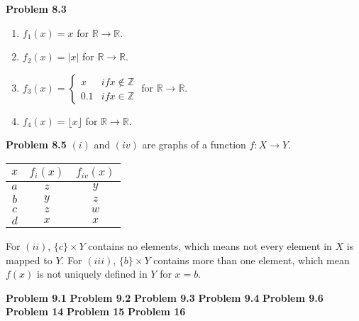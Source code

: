 \documentclass{article}
\begin{document}
\textbf{Problem 8.3}
\begin{enumerate}[label={(\roman*)}]
    \item $f_1(x)=x$ for $\mathbb{R}\rightarrow\mathbb{R}$.
    \item $f_2(x)=|x|$  for $\mathbb{R}\rightarrow\mathbb{R}$.
    \item $f_3(x)=\begin{cases}
        x & if x\not\in\mathbb{Z} \\
        0.1 & if x\in\mathbb{Z}
    \end{cases}$ for $\mathbb{R}\rightarrow\mathbb{R}$.
    \item $f_4(x)=\lfloor x\rfloor$ for $\mathbb{R}\rightarrow\mathbb{R}$.
\end{enumerate}
\bigbreak

\textbf{Problem 8.5}
$(i)$ and $(iv)$ are graphs of a function $f:X\rightarrow Y$.
\begin{center}
    \begin{tabular}{ |c|c c| } 
     \hline
     $x$ & $f_i(x)$ & $f_{iv}(x)$  \\ 
     \hline
     $a$ & $z$ & $y$ \\ 
     $b$ & $y$ & $z$ \\ 
     $c$ & $z$ & $w$ \\ 
     $d$ & $x$ & $x$ \\ 
     \hline
    \end{tabular}
\end{center}

For $(ii)$, $\{c\}\times Y$ contains no elements, which means not every element in $X$ is mapped to $Y$. 
For $(iii)$, $\{b\}\times Y$ contains more than one element, which mean $f(x)$ is not uniquely defined in $Y$ for $x=b$.
\bigbreak

\textbf{Problem 9.1}
\bigbreak
\textbf{Problem 9.2}
\bigbreak
\textbf{Problem 9.3}
\bigbreak
\textbf{Problem 9.4}
\bigbreak
\textbf{Problem 9.6}
\bigbreak
\textbf{Problem 14}
\bigbreak
\textbf{Problem 15}
\bigbreak
\textbf{Problem 16}
\end{document}
